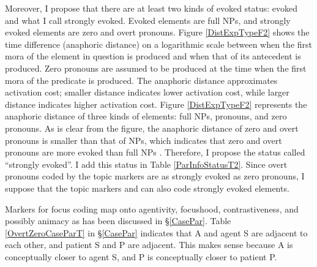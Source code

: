Moreover,
I propose that there are at least two kinds of evoked status:
evoked and what I call strongly evoked.
Evoked elements are full NPs, and
strongly evoked elements are zero and overt pronouns.
Figure \ref{DistExpTypeF2} shows the time difference (anaphoric distance) on a logarithmic scale between when the first mora of the element in question is produced and when that of its antecedent is produced.
Zero pronouns are assumed to be produced at the time when
the first mora of the predicate is produced.
The anaphoric distance approximates activation cost;
smaller distance indicates lower activation cost,
while larger distance indicates higher activation cost.
Figure \ref{DistExpTypeF2} represents the anaphoric distance of three kinds of elements:
full NPs, pronouns, and zero pronouns.
As is clear from the figure,
the anaphoric distance of zero and overt pronouns is smaller than
that of NPs,
which indicates that
zero and overt pronouns are more evoked than full NPs .
Therefore, I propose the status called ``strongly evoked''.
I add this status in Table \ref{ParInfoStatusT2}.
Since overt pronouns coded by the topic markers are as strongly evoked as zero pronouns,
I suppose that the topic markers  and  can also code strongly evoked elements.

Markers for focus coding map onto agentivity, focushood, contrastiveness, and possibly animacy
as has been discussed in \S \ref{CasePar}.
Table \ref{OvertZeroCaseParT} in \S \ref{CasePar} indicates that
A and agent S are adjacent to each other, and
patient S and P are adjacent.
This makes sense because
A is conceptually closer to agent S, and
P is conceptually closer to patient P.

